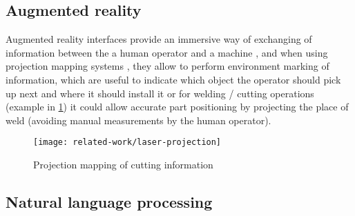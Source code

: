 

\subsection{Augmented reality}

Augmented reality interfaces provide an immersive way of exchanging of information between the a human operator and a machine \cite{Bimber2005}, and when using projection mapping systems \cite{Tan2013,Fujimoto2014}, they allow to perform environment marking of information, which are useful to indicate which object the operator should pick up next and where it should install it or for welding / cutting operations (example in \cref{fig:laser-projection}) it could allow accurate part positioning by projecting the place of weld (avoiding manual measurements by the human operator).

\begin{figure}[H]
	\centering
	\texttt{[image: related-work/laser-projection]}
	\caption[Projection mapping of cutting information]{Projection mapping of cutting information\protect\footnotemark}
	\label{fig:laser-projection}
\end{figure}

%


\subsection{Natural language processing}

